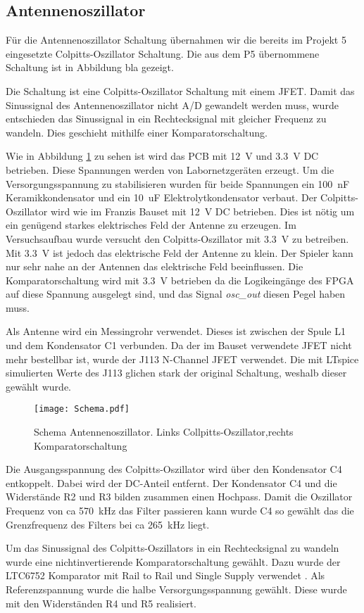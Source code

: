 \subsection{Antennenoszillator}\label{subsec:Antennenoszilator}
Für die Antennenoszillator Schaltung übernahmen wir die bereits im Projekt 5 eingesetzte Colpitts-Oszillator Schaltung. Die aus dem P5 übernommene Schaltung ist in Abbildung bla  gezeigt. 

Die Schaltung ist eine Colpitts-Oszillator Schaltung mit einem JFET. 
Damit das Sinussignal des Antennenoszillator nicht A/D gewandelt werden muss, wurde entschieden das Sinussignal in ein Rechtecksignal mit gleicher Frequenz zu wandeln. Dies geschieht mithilfe einer Komparatorschaltung. 

Wie in Abbildung \ref{img:Schema} zu sehen ist wird das PCB mit \SI{12}{V} und \SI{3.3}{V} DC betrieben. Diese Spannungen werden von Labornetzgeräten erzeugt. Um die Versorgungsspannung zu stabilisieren wurden für beide Spannungen ein  \SI{100}{nF} Keramikkondensator und ein \SI{10}{uF} Elektrolytkondensator verbaut. 
Der Colpitts-Oszillator wird wie im Franzis Bauset mit \SI{12}{V} DC betrieben. Dies ist nötig um ein genügend starkes elektrisches Feld der Antenne zu erzeugen. Im Versuchsaufbau wurde versucht den Colpitts-Oszillator mit \SI{3.3}{V} zu betreiben. Mit \SI{3.3}{V} ist jedoch das elektrische Feld der Antenne zu klein. Der Spieler kann nur sehr nahe an der Antennen das elektrische Feld beeinflussen.
Die Komparatorschaltung wird mit \SI{3.3}{V} betrieben da die Logikeingänge des FPGA auf diese Spannung ausgelegt sind, und das Signal \textit{osc\_out} diesen Pegel haben muss.

Als Antenne wird ein Messingrohr verwendet. Dieses ist zwischen der Spule L1 und dem Kondensator C1 verbunden. 
Da der im Bauset verwendete JFET nicht mehr bestellbar ist, wurde der J113 N-Channel JFET verwendet. Die mit LTspice simulierten Werte des J113 glichen stark der original Schaltung, weshalb dieser gewählt wurde. 

\begin{figure}[h]
	\centering
	\texttt{[image: Schema.pdf]}
	\caption{ Schema Antennenoszillator. Links Collpitts-Oszillator,rechts Komparatorschaltung}
	\label{img:Schema}
\end{figure}

\clearpage

Die Ausgangsspannung des Colpitts-Oszillator wird über den Kondensator C4 entkoppelt. Dabei wird der DC-Anteil entfernt. Der Kondensator C4 und die Widerstände R2 und R3 bilden zusammen einen Hochpass. Damit die Oszillator Frequenz von ca \SI{570}{kHz} das Filter passieren kann wurde C4 so gewählt das die Grenzfrequenz des Filters bei ca \SI{265}{kHz} liegt. 

Um das Sinussignal des Colpitts-Oszillators in ein Rechtecksignal zu wandeln wurde eine nichtinvertierende Komparatorschaltung gewählt. Dazu wurde der LTC6752 Komparator mit Rail to Rail und Single Supply verwendet \cite{LTC}. Als Referenzspannung wurde die halbe Versorgungsspannung gewählt. Diese wurde mit den Widerständen R4 und R5 realisiert.


